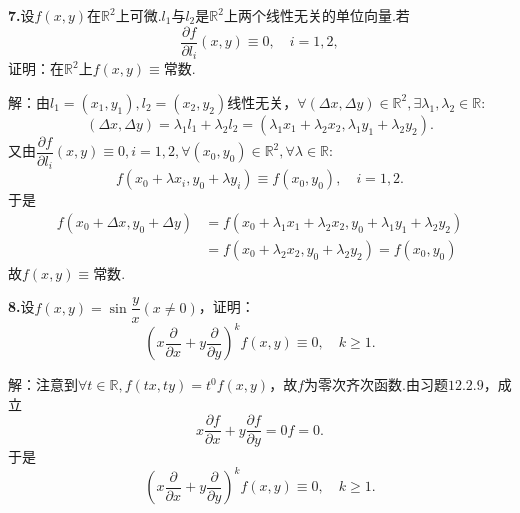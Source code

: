 \documentclass[12pt, a4paper]{article}
\newcommand{\RR}{\mathbb{R}}
\begin{document}
\textbf{7.}设\(f(x, y)\)在\(\RR^2\)上可微.\(l_1\)与\(l_2\)是\(\RR^2\)上两个线性无关的单位向量.若
\[\frac{\partial f}{\partial l_i}(x, y) \equiv 0, \quad i = 1, 2,\]
证明：在\(\RR^2\)上\(f(x, y) \equiv \text{常数}\).

解：由\(l_1 = (x_1, y_1), l_2 = (x_2, y_2)\)线性无关，\(\forall (\Delta x, \Delta y) \in \RR^2, \exists \lambda_1, \lambda_2 \in \RR:\)
\[(\Delta x, \Delta y) = \lambda_1 l_1 + \lambda_2 l_2 = (\lambda_1 x_1 + \lambda_2 x_2, \lambda_1 y_1 + \lambda_2 y_2).\]
又由\(\dfrac{\partial f}{\partial l_i}(x, y) \equiv 0, i = 1, 2, \forall (x_0, y_0) \in \RR^2, \forall \lambda \in \RR:\)
\[f(x_0 + \lambda x_i, y_0 + \lambda y_i) \equiv f(x_0, y_0), \quad i = 1, 2.\]
于是
\begin{align*}
f(x_0 + \Delta x, y_0 + \Delta y) &= f(x_0 + \lambda_1 x_1 + \lambda_2 x_2, y_0 + \lambda_1 y_1 + \lambda_2 y_2) \\
&= f(x_0 + \lambda_2 x_2, y_0 + \lambda_2 y_2) = f(x_0, y_0)
\end{align*}
故\(f(x, y) \equiv \text{常数}\).

\textbf{8.}设\(f(x, y) = \sin\dfrac{y}{x} (x \neq 0)\)，证明：
\[\left(x \frac{\partial}{\partial x} + y \frac{\partial}{\partial y}\right)^k f(x, y) \equiv 0, \quad k \geq 1.\]

解：注意到\(\forall t \in \RR, f(tx, ty) = t^0f(x, y)\)，故\(f\)为零次齐次函数.由习题\(12.2.9\)，成立
\[x \frac{\partial f}{\partial x} + y \frac{\partial f}{\partial y} = 0f = 0.\]
于是
\[\left(x \frac{\partial}{\partial x} + y \frac{\partial}{\partial y}\right)^k f(x, y) \equiv 0, \quad k \geq 1.\]
\end{document}
